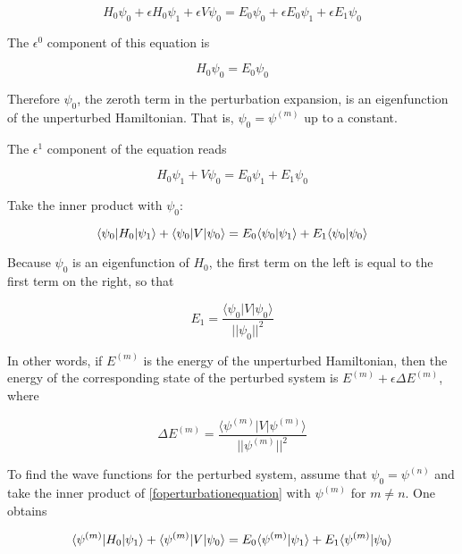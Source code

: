 \begin{equation}
H_0\psi_0 + \epsilon H_0 \psi_1 + \epsilon V\psi_0
 =
E_0\psi_0 + \epsilon E_0 \psi_1 + \epsilon E_1 \psi_0
\end{equation}

The $\epsilon^0$ component of this equation is


\begin{equation}
H_0\psi_0 = 
E_0\psi_0 
\end{equation}

Therefore $\psi_0$, the zeroth term in the perturbation expansion, is an eigenfunction of the unperturbed Hamiltonian.  That is, $\psi_0 = \psi^{(m)}$ up to  a constant.  

The $\epsilon^1$ component of the equation reads

\begin{equation}
\label{foperturbationequation}
 H_0 \psi_1 + V\psi_0
 =
 E_0 \psi_1 +  E_1 \psi_0
\end{equation}


Take the inner product with $\psi_0$:

\begin{equation}
 \langle \psi_0 | H_0  | \psi_1\rangle +  \langle \psi_0  | V | \psi_0 \rangle
 =
 E_0 \langle \psi_0  |  \psi_1 \rangle +  E_1 \langle \psi_0  |  \psi_0 \rangle
\end{equation}

Because $\psi_0$ is an eigenfunction of $H_0$, the first term on the left is equal to the first term on the right, so that

\begin{equation}
\label{perturbation-of-energy}
E_1 =\frac{ \langle\psi_0 | V | \psi_0\rangle}{ ||\psi_0||^2 }
\end{equation}

In other words, if $E^{(m)}$ is the energy of the unperturbed Hamiltonian, then the energy of the corresponding state of the perturbed system is $E^{(m)} + \epsilon \Delta E^{(m)}$, where

\begin{equation}
\label{perturbation-of-En}
\Delta E^{(m)} =\frac{\langle \psi^{(m)} | V | \psi^{(m)} \rangle }{ || \psi^{(m)} ||^2 }
\end{equation}

To find the wave functions for the perturbed system, assume that $\psi_0 = \psi^{(n)}$ and take the inner product of \eqref{foperturbationequation} with $\psi^{(m)}$ for $m \ne n$.  One obtains

\begin{equation}
\langle \psi^{(m)} | H_0 | \psi_1 \rangle + \langle \psi^{(m)} | V | \psi_0 \rangle
  =
E_0\langle \psi^{(m)} | \psi_1 \rangle + E_1\langle \psi^{(m)} | \psi_0 \rangle
\end{equation}

